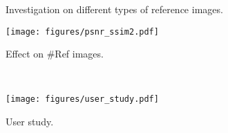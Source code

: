 \documentclass[runningheads]{llncs}
\begin{document}
\begin{figure}[!t]
    \setlength\belowcaptionskip{-5pt}
    \setlength\abovecaptionskip{-1pt}
	\caption{Investigation on different types of reference images.}  
	\label{fig:diffref}    
\end{figure}


\begin{figure}[t]
\setlength\belowcaptionskip{-2pt}
\centering
\begin{minipage}[t]{0.48\textwidth}
\centering
\texttt{[image: figures/psnr\_ssim2.pdf]}
\caption{Effect on \#Ref images.}
\label{fig:effect_ref_no}
\end{minipage}
~~~~~
\begin{minipage}[t]{0.46\textwidth}
\centering
\texttt{[image: figures/user\_study.pdf]}
\caption{User study.}
\label{fig:user_study}
\end{minipage}
\end{figure}
\end{document}
